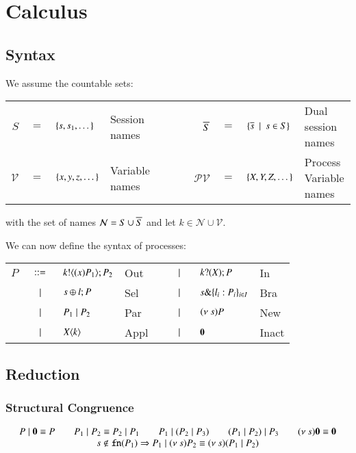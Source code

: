 \section{Calculus}

\subsection{Syntax}
We assume the countable sets:

\begin{tabular}{rcllcrcll}
	$S$ &$=$& $\{s, s_1, \dots\}$ & Session names
	&$\qquad$&
	$\overline{S}$ &$=$& $\{\overline{s} \ \ |\ \  s \in S\}$ & Dual session names
	\\

	$\mathcal{V}$ &$=$& $\{x,y,z, \dots\}$ & Variable names
	&$\qquad$&
	$\mathcal{PV}$ &$=$& $\{X, Y, Z, \dots\}$ & Process Variable names
\end{tabular}
with the set of names $\mathcal{N} = S \cup \overline{S}$ and let $k \in \mathcal{N} \cup \mathcal{V}$.


We can now define the syntax of processes:


\begin{tabular}{rcllccll}
	$P$	&$\;\;::=\;\;$&	$k ! \langle (x)P_1 \rangle ; P_2$	& Out
		&\qquad&
		$\;\;\;|\;\;\;$&	$k ? (X) ; P$		& In
		\\
		&$\;\;\;|\;\;\;$& 	$s \oplus l ; P$			& Sel
		&\qquad&
		$\;\;\;|\;\;\;$&	$s \& \{l_i:P_i\}_{i \in I}$	& Bra
		\\
		&$\;\;\;|\;\;\;$&	$P_1 \;|\; P_2$			& Par
		&\qquad&
		$\;\;\;|\;\;\;$&	$(\nu\ s) P$			& New
		\\
		&$\;\;\;|\;\;\;$&	$X\langle k \rangle$			& Appl
		&\qquad&
		$\;\;\;|\;\;\;$&	$\mathbf{0}$			& Inact
\end{tabular}

\subsection{Reduction}

\subsubsection{Structural Congruence}
\[
	\begin{array}{c}
		P \;|\; \mathbf{0} \equiv P \qquad P_1 \;|\; P_2 \equiv P_2 \;|\; P_1 \qquad P_1 \;|\; (P_2 \;|\; P_3)
		\qquad (P_1 \;|\; P_2) \;|\; P_3 \qquad (\nu\ s) \mathbf{0} \equiv \mathbf{0}\\
		s \notin \mathtt{fn}(P_1) \Rightarrow P_1 \;|\; (\nu\ s) P_2 \equiv (\nu\ s)(P_1 \;|\; P_2)
	\end{array}
\]

